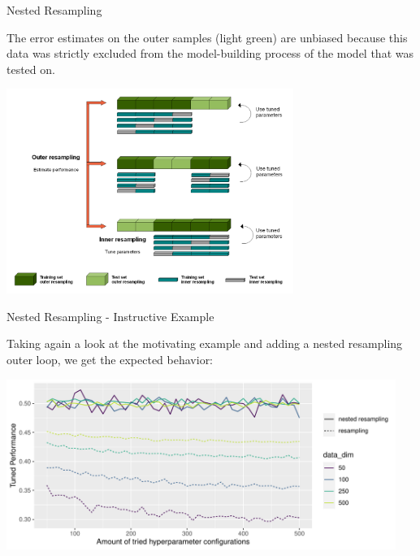 \begin{vbframe}{Nested Resampling}
\framebreak

\begin{footnotesize}
The error estimates on the outer samples (light green) are unbiased because this data was strictly excluded from the model-building process of the model that was tested on.
\end{footnotesize}


\begin{center}\includegraphics[width = 0.7\textwidth]{figure_man/Nested_Resampling.png}\end{center}

\end{vbframe}



\begin{vbframe}{Nested Resampling - Instructive Example}

Taking again a look at the motivating example and adding a nested resampling outer loop, we get the expected behavior:

\begin{knitrout}\scriptsize
{}\color{fgcolor}

{\centering \includegraphics[width=0.95\textwidth]{figure/cart_tuning_nestresample_1} 
}


\end{knitrout}


\end{vbframe}
\endlecture

